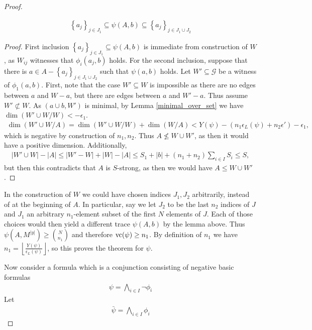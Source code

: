 \documentclass{amsart}
\newcommand{\GG}{\mathcal G}
\newcommand{\curly}[1]{\left\{#1\right\}}
\newcommand{\paren}[1]{\left(#1\right)}
\providecommand{\floor}[1]{\left \lfloor #1 \right \rfloor }
\begin{document}
\begin{proof}
  \begin{Lemma}
    \begin{align*}
      \curly{a_j}_{j \in J_1} \subseteq \psi(A, b) \subseteq \curly{a_j}_{j \in J_1 \cup J_2}
    \end{align*}
  \end{Lemma}
  \begin{proof}
    First inclusion $\curly{a_j}_{j \in J_1} \subseteq \psi(A, b)$ is immediate from construction of $W$,
    as $W_{ij}$ witnesses that $\phi_i(a_j, b)$ holds.
    For the second inclusion, suppose that there is $a \in A - \curly{a_j}_{j \in J_1 \cup J_2}$ such that $\psi(a,b)$ holds.
    Let $W' \subseteq \GG$ be a witness of $\phi_1(a,b)$.
    First, note that the case $W' \subseteq W$ is impossible
    as there are no edges between $a$ and $W - a$, but there are edges between $a$ and $W' - a$.
    Thus assume $W' \not\subset W$.
    As $(a \cup b, W')$ is minimal, by Lemma \ref{minimal_over_set} we have $\dim (W' \cup W / W) < -\epsilon_1$.
    \begin{align*}
      \dim(W' \cup W / A) = \dim (W' \cup W / W) + \dim(W/A) < Y(\psi) - \paren{n_1 \epsilon_L(\psi) + n_2 \epsilon'} - \epsilon_1,
    \end{align*}
    which is negative by construction of $n_1, n_2$.
    Thus $A \not\leq W \cup W'$, as then it would have a positive dimension.
    Additionally,
    \begin{align*}
      |W' \cup W| - |A| \leq |W' - W| + |W| - |A| \leq S_1 + |b| + (n_1 + n_2) \sum_{i \in I} S_i \leq S,
    \end{align*}
    but then this contradicts that $A$ is $S$-strong, as then we would have $A \leq W \cup W'$.
  \end{proof}

  In the construction of $W$ we could have chosen indices $J_1, J_2$ arbitrarily, instead of at the beginning of $A$.
  In particular, say we let $J_2$ to be the last $n_2$ indices of $J$ and
  $J_1$ an arbitrary $n_1$-element subset of the first $N$ elements of $J$.
  Each of those choices would then yield a different trace $\psi(A, b)$ by the lemma above.
  Thus $\psi(A, M^{|y|}) \geq {N \choose n_1}$ and therefore $\operatorname{vc}(\psi) \geq n_1$.
  By definition of $n_1$ we have $n_1 = \floor{\frac{Y(\psi)}{\epsilon_L(\psi)}}$, so this proves the theorem for $\psi$.
 
  Now consider a formula which is a conjunction consisting of negative basic formulas
  \begin{align*}
    \psi = \bigwedge_{i \in I} \neg \phi_i
  \end{align*}
  Let
  \begin{align*}
    \bar \psi = \bigwedge_{i \in I} \phi_i
  \end{align*}


\end{proof}
\end{document}
